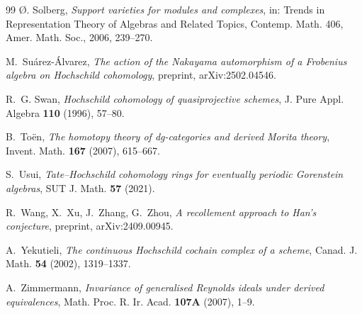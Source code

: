 \documentclass[11pt]{amsart}
\theoremstyle{definition}
\begin{document}
\begin{thebibliography}{99}
 \O. Solberg, \emph{Support varieties for modules and
complexes}, in: Trends in Representation Theory of Algebras and Related
Topics, Contemp. Math. 406, Amer. Math. Soc., 2006, 239--270.

 M.~Su\'arez-\'Alvarez, \emph{The action of the
Nakayama automorphism of a Frobenius algebra on Hochschild cohomology},
preprint, arXiv:2502.04546.

 R.~G. Swan, \emph{Hochschild cohomology of quasiprojective
schemes}, J. Pure Appl. Algebra \textbf{110} (1996), 57--80.

 B.~To\"en, \emph{The homotopy theory of dg-categories and
derived Morita theory}, Invent. Math. \textbf{167} (2007), 615--667.

 S.~Usui, \emph{Tate--Hochschild cohomology rings for
eventually periodic Gorenstein algebras}, SUT J. Math. \textbf{57} (2021).

 R.~Wang, X.~Xu, J.~Zhang, G.~Zhou, \emph{A recollement
approach to Han's conjecture}, preprint, arXiv:2409.00945.

 A.~Yekutieli, \emph{The continuous Hochschild cochain
complex of a scheme}, Canad. J. Math. \textbf{54} (2002), 1319--1337.

 A.~Zimmermann, \emph{Invariance of generalised Reynolds
ideals under derived equivalences}, Math. Proc. R. Ir. Acad. \textbf{107A}
(2007), 1--9.

\end{thebibliography}
\end{document}
